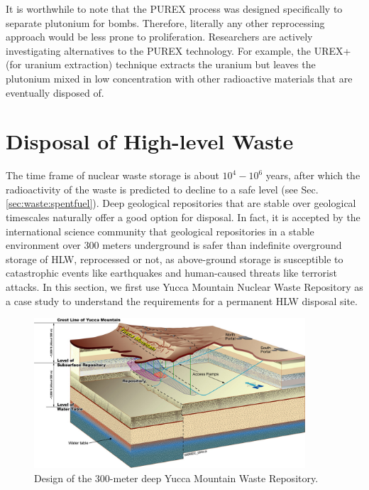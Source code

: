 \documentclass[nofootinbib,preprint,aps]{revtex4-1}
\begin{document}
    It is worthwhile to note that the PUREX process was designed specifically to separate plutonium for
    bombs. Therefore, literally any other reprocessing approach would be less prone to proliferation.
    Researchers are actively investigating alternatives to the PUREX technology. For example, the UREX+ (for
    uranium extraction) technique extracts the uranium but leaves the plutonium mixed in low concentration
    with other
    radioactive materials that are eventually disposed of.\cite[chapt. 7]{aa12}

\section{Disposal of High-level Waste}
\label{sec:disposal}
    The time frame of nuclear waste storage is about $10^4-10^6$ years, after which the radioactivity
    of the waste is predicted to decline to a safe level (see Sec.\ref{sec:waste:spentfuel}).
    Deep geological repositories that are stable over geological timescales naturally offer a good option for disposal.
    In fact, it is accepted by the international science community that geological repositories in a stable environment over 300 meters underground 
    is safer than indefinite overground storage of HLW, reprocessed or not, as above-ground storage
    is susceptible to catastrophic events like earthquakes and human-caused
    threats like terrorist attacks.\cite{fmr11}
    In this section, we first use Yucca Mountain Nuclear Waste
    Repository as a case study to understand the requirements for a permanent HLW disposal site.

    \begin{figure}[h]
            \centering
            \includegraphics[width=0.9\textwidth]{yuccaRepo.jpg}
            \caption{Design of the 300-meter deep Yucca Mountain Waste Repository.\cite{yucpic}}
            \label{fig:yucca}
        \end{figure}
\end{document}
